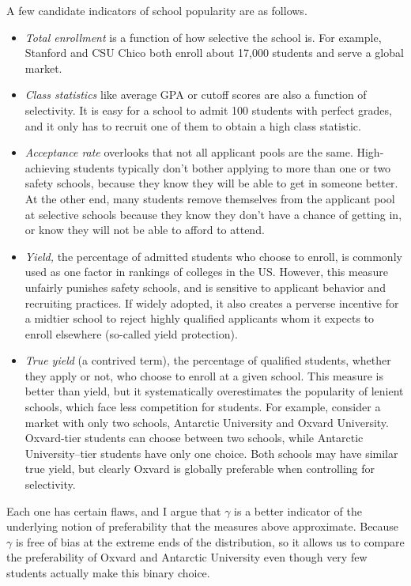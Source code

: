 \documentclass[12pt]{article}
\theoremstyle{definition}
\begin{document}
A few candidate indicators of school popularity are as follows.
\begin{itemize}
\item \emph{Total enrollment} is a function of how selective the school is. For example, Stanford and CSU Chico both enroll about 17,000 students and serve a global market.
\item \emph{Class statistics} like average GPA or cutoff scores are also a function of selectivity. It is easy for a school to admit 100 students with perfect grades, and it only has to recruit one of them to obtain a high class statistic.
\item \emph{Acceptance rate} overlooks that not all applicant pools are the same. High-achieving students typically don’t bother applying to more than one or two safety schools, because they know they will be able to get in someone better. At the other end, many students remove themselves from the applicant pool at selective schools because they know they don’t have a chance of getting in, or know they will not be able to afford to attend. 
\item \emph{Yield,} the percentage of admitted students who choose to enroll, is commonly used as one factor in rankings of colleges in the US. However, this measure unfairly punishes safety schools, and is sensitive to applicant behavior and recruiting practices. If widely adopted, it also creates a perverse incentive for a midtier school to reject highly qualified applicants whom it expects to enroll elsewhere (so-called yield protection).  
\item \emph{True yield} (a contrived term), the percentage of qualified students, whether they apply or not, who choose to enroll at a given school. This measure is better than yield, but it systematically overestimates the popularity of lenient schools, which face less competition for students. For example, consider a market with only two schools, Antarctic University and Oxvard University. Oxvard-tier students can choose between two schools, while Antarctic University--tier students have only one choice. Both schools may have similar true yield, but clearly Oxvard is globally preferable when controlling for selectivity. %
\end{itemize}
Each one has certain flaws, and I argue that $\gamma$ is a better indicator of the underlying notion of preferability that the measures above approximate. Because $\gamma$ is free of bias at the extreme ends of the distribution, so it allows us to compare the preferability of Oxvard and Antarctic University even though very few students actually make this binary choice. 
\end{document}
